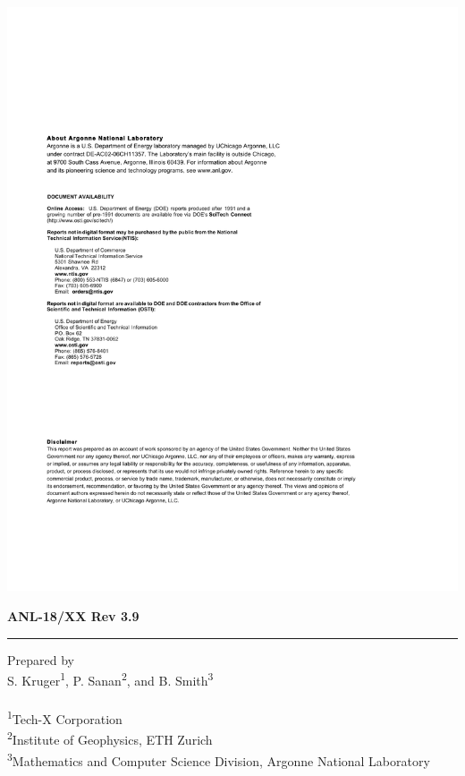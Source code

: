 \vspace*{10pt}
\vspace*{20pt}



\newpage
\centerline{\includegraphics{ArgonneReportTemplatePage2}}
\newpage

\hfill {\large {\bf ANL-18/XX Rev 3.9}}

\vspace*{2in}
\vspace*{8pt}
\hrule
\vspace*{8pt}

\vspace*{0.5in}
\noindent Prepared by \\
{S. Kruger\textsuperscript{1}, P. Sanan\textsuperscript{2}, and B. Smith\textsuperscript{3}}\\
\\
\textsuperscript{1}Tech-X Corporation \\
\textsuperscript{2}Institute of Geophysics, ETH Zurich\\
\textsuperscript{3}Mathematics and Computer Science Division, Argonne National Laboratory \\

